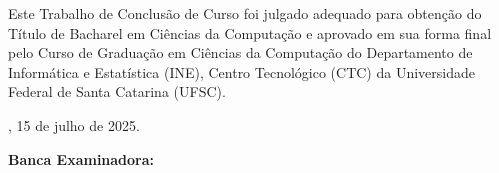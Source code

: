 \begin{folhadeaprovacao}
    \begin{center}
        {\imprimirautor}

        \begin{center}
            \ABNTEXchapterfont\bfseries\MakeUppercase{\imprimirtitulo}\ifnotempty{\imprimirsubtitulo}{:
            \imprimirsubtitulo}
        \end{center}

        \begin{minipage}{\textwidth}
            Este Trabalho de Conclusão de Curso foi julgado adequado para obtenção do Título de
            Bacharel em Ciências da Computação e aprovado em sua forma final pelo Curso de Graduação em Ciências da
            Computação do Departamento de Informática e Estatística (INE), Centro Tecnológico (CTC) da Universidade
            Federal de Santa Catarina (UFSC).
        \end{minipage}
    \end{center}

    \imprimirlocal, 15 de julho de 2025.


    \vspace{1cm}
    \textbf{Banca Examinadora:}

    \vspace{1cm}
    \assinatura{
    	\textbf{\imprimirorientador} \\
		\imprimirorientadorRotulo \\
		\imprimirinstituicao
    }

    \vspace{1cm}
    \assinatura{
		\textbf{\imprimircoorientador} \\
		\imprimircoorientadorRotulo \\
		\imprimirinstituicao
    }

    \vspace{1cm}
\end{folhadeaprovacao}